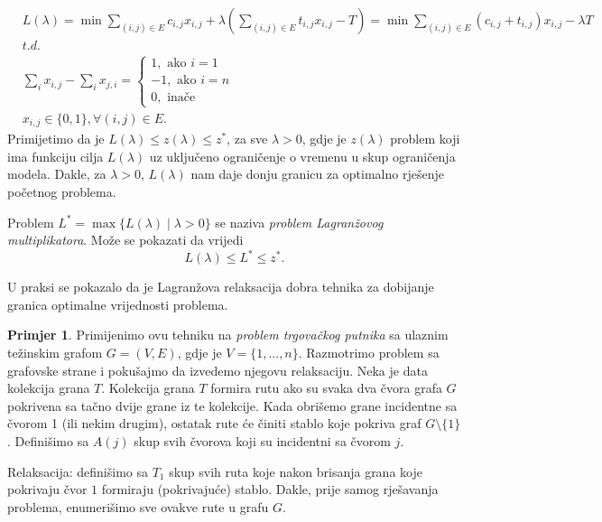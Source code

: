\documentclass[a4paper, utf8, 11pt, colorlinks]{book}
\theoremstyle{definition}
\newtheorem{primjer}{Primjer}[chapter]
\begin{document}
\begin{align*}
       &L(\lambda)= \min\sum_{(i,j) \in E }c_{i,j}x_{i,j}  + \lambda(\sum_{(i,j) \in E} t_{i,j} x_{i,j} - T ) = \min \sum_{(i,j) \in E} (c_{i,j} + t_{i,j} )x_{i,j} - \lambda T \\
        &{t.d. }\\
    & \sum_{i} x_{i,j} - \sum_{i} x_{j,i} = \begin{cases}  
                                               1, \mbox{ ako } i=1 \\
                                              -1, \mbox{ ako } i=n \\
                                               0, \mbox{ inače }
                                            \end{cases} \\
     & x_{i,j} \in \{0, 1 \}, \forall (i,j) \in E.
\end{align*}
Primijetimo da je $L(\lambda) \leq z(\lambda)  \leq z^*$, za sve $\lambda > 0$, gdje je $z(\lambda)$ problem koji ima funkciju cilja $L(\lambda)$ uz uključeno ograničenje o vremenu u skup ograničenja modela. Dakle, za $\lambda >0$, $L(\lambda)$ nam daje donju granicu za optimalno rješenje početnog problema. 

Problem $L^* = \max \{ L(\lambda) \mid \lambda > 0  \}$ se naziva \emph{problem Lagranžovog multiplikatora}. Može se pokazati da vrijedi 
$$ L(\lambda) \leq L^* \leq z^*.$$

U praksi se pokazalo da je Lagranžova relaksacija dobra tehnika za dobijanje granica optimalne vrijednosti problema. 


\begin{primjer}
Primijenimo ovu tehniku na \emph{problem trgovačkog putnika} sa ulaznim težinskim grafom $G=(V,E)$, gdje je $V=\{1, \ldots, n\}$.  Razmotrimo  problem sa grafovske strane i pokušajmo da izvedemo njegovu relaksaciju. Neka je data kolekcija grana $T$. Kolekcija grana $T$ formira rutu ako su svaka dva čvora grafa $G$ pokrivena sa tačno dvije grane iz te kolekcije. Kada obrišemo grane incidentne sa čvorom 1 (ili nekim drugim), ostatak rute će činiti stablo koje pokriva graf  $G\setminus \{1\}$.  
Definišimo sa $A(j)$ skup svih čvorova koji su incidentni sa čvorom $j$. 
\end{primjer}
Relaksacija: definišimo sa $T_1$ skup svih ruta koje nakon brisanja grana koje pokrivaju čvor $1$ formiraju (pokrivajuće) stablo.  Dakle, prije samog rješavanja problema, enumerišimo sve ovakve rute u grafu $G$. 
\end{document}
